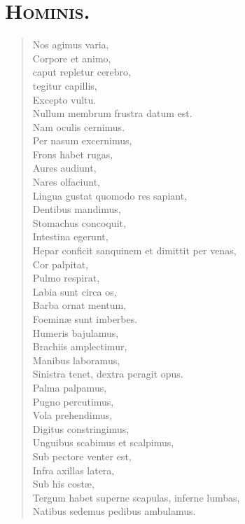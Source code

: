 \section*{\textsc{Hominis.}}


\begin{verse}

  Nos agimus varia,\\
  Corpore et animo,\\
  caput repletur cerebro,\\
  tegitur capillis,\\
  Excepto vultu.\\
  Nullum membrum frustra datum est.\\
  Nam oculis cernimus.\\
  Per nasum excernimus,\\
  Frons habet rugas,\\
  Aures audiunt,\\
  Nares olfaciunt,\\
  Lingua gustat quomodo res sapiant,\\
  Dentibus mandimus,\\
  Stomachus concoquit,\\
  Intestina egerunt,\\
  Hepar conficit sanquinem et dimittit per venas,\\
  Cor palpitat,\\
  Pulmo respirat,\\
  Labia sunt circa os,\\
  Barba ornat mentum,\\
  Foeminæ sunt imberbes.\\
  Humeris bajulamus,\\
  Brachiis amplectimur,\\
  Manibus laboramus,\\
  Sinistra tenet, dextra peragit opus.\\
  Palma palpamus,\\
  Pugno percutimus,\\
  Vola prehendimus,\\
  Digitus constringimus,\\
  Unguibus scabimus et scalpimus,\\
  Sub pectore venter est,\\
  Infra axillas latera,\\
  Sub his costæ,\\
  Tergum habet superne scapulas, inferne lumbas,\\
  Natibus sedemus pedibus ambulamus.\\
\end{verse}



